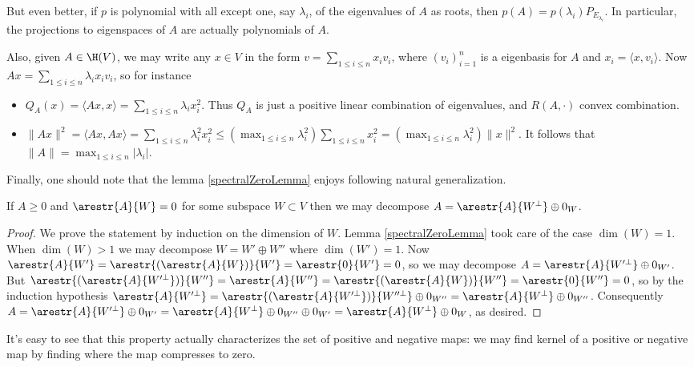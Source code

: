 But even better, if $p$ is polynomial with all except one, say $\lambda_{i}$, of the eigenvalues of $A$ as roots, then $p(A) = p(\lambda_{i}) P_{E_{\lambda_{i}}}$. In particular, the projections to eigenspaces of $A$ are actually polynomials of $A$.

Also, given $A \in \H(V)$, we may write any $x \in V$ in the form $v = \sum_{1 \leq i \leq n} x_{i} v_{i}$, where $(v_{i})_{i = 1}^{n}$ is a eigenbasis for $A$ and $x_{i} = \langle x, v_{i} \rangle$. Now $A x = \sum_{1 \leq i \leq n} \lambda_{i} x_{i} v_{i}$, so for instance

\begin{itemize}
\item $Q_{A}(x) = \langle A x, x \rangle = \sum_{1 \leq i \leq n} \lambda_{i} x_{i}^{2}$. Thus $Q_{A}$ is just a positive linear combination of eigenvalues, and $R(A, \cdot)$ convex combination.
\item $\|A x\|^{2} = \langle A x, A x \rangle = \sum_{1 \leq i \leq n} \lambda_{i}^{2} x_{i}^{2} \leq \left(\max_{1 \leq i \leq n} \lambda_{i}^2 \right) \sum_{1 \leq i \leq n} x_{i}^2 = \left(\max_{1 \leq i \leq n} \lambda_{i}^2 \right) \|x\|^{2}$. It follows that $\|A\| = \max_{1 \leq i \leq n} |\lambda_{i}|$.
\end{itemize}

Finally, one should note that the lemma \ref{spectralZeroLemma} enjoys following natural generalization.

\begin{prop}\label{posnegfact}
	If $A \geq 0$ and $\arestr{A}{W} = 0$ for some subspace $W \subset V$ then we may decompose $A = \arestr{A}{W^{\perp}} \oplus 0_{W}$.
\end{prop}
\begin{proof}
	We prove the statement by induction on the dimension of $W$. Lemma \ref{spectralZeroLemma} took care of the case $\dim(W) = 1$. When $\dim(W) > 1$ we may decompose $W = W' \oplus W''$ where $\dim(W') = 1$. Now $\arestr{A}{W'} = \arestr{(\arestr{A}{W})}{W'} = \arestr{0}{W'} = 0$, so we may decompose $A = \arestr{A}{W'^{\perp}} \oplus 0_{W'}$. But $\arestr{(\arestr{A}{W'^{\perp}})}{W''} = \arestr{A}{W''} = \arestr{(\arestr{A}{W})}{W''} = \arestr{0}{W''} = 0$, so by the induction hypothesis $\arestr{A}{W'^{\perp}} = \arestr{(\arestr{A}{W'^{\perp}})}{W''^{\perp}} \oplus 0_{W''} = \arestr{A}{W^{\perp}} \oplus 0_{W''}$. Consequently $A = \arestr{A}{W'^{\perp}} \oplus 0_{W'} = \arestr{A}{W^{\perp}} \oplus 0_{W''} \oplus 0_{W'} = \arestr{A}{W^{\perp}} \oplus 0_{W}$, as desired.
\end{proof}
It's easy to see that this property actually characterizes the set of positive and negative maps: we may find kernel of a positive or negative map by finding where the map compresses to zero.

